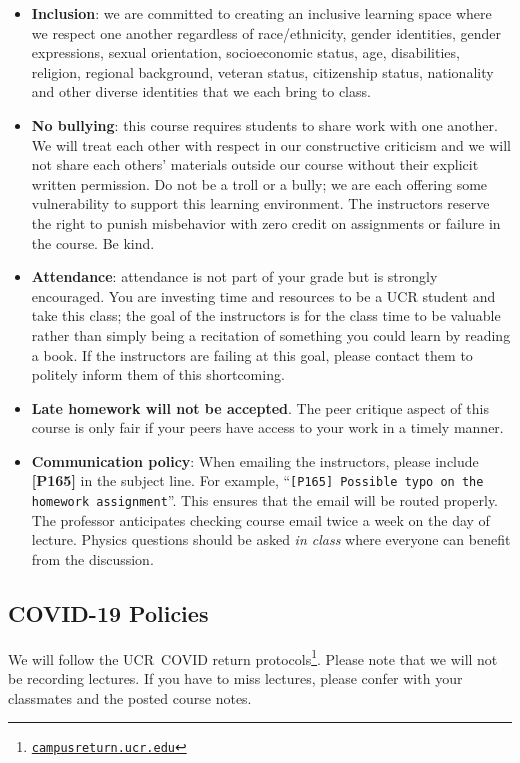 \documentclass[12pt]{article}
\newcommand{\footlink}[1]{\footnote{\href{https://#1}{\texttt{#1}}}}
\newcommand{\UCR}{\acro{UCR}\xspace}
\newcommand\acro[1]{{\small {#1}}}
\numberwithin{equation}{section}    %
\begin{document}
\begin{itemize}
	\item \textbf{Inclusion}: we are committed to creating an inclusive learning space where we respect one another regardless of race/ethnicity, gender identities, gender expressions, sexual orientation, socioeconomic status, age, disabilities, religion, regional background, veteran status, citizenship status, nationality and other diverse identities that we each bring to class.
	\item \textbf{No bullying}: this course requires students to share work with one another. We will treat each other with respect in our constructive criticism and we will not share each others' materials outside our course without their explicit written permission. Do not be a troll or a bully; we are each offering some vulnerability to support this learning environment. The instructors reserve the right to punish misbehavior with zero credit on assignments or failure in the course. Be kind.
	\item \textbf{Attendance}: attendance is not part of your grade but is strongly encouraged. You are investing time and resources to be a \UCR student and take this class; the goal of the instructors is for the class time to be valuable rather than simply being a recitation of something you could learn by reading a book. If the instructors are failing at this goal, please contact them to politely inform them of this shortcoming. 
	\item \textbf{Late homework will not be accepted}. The peer critique aspect of this course is only fair if your peers have access to your work in a timely manner.  
	\item \textbf{Communication policy}: When emailing the instructors, please include \textbf{[P165]} in the subject line. For example, ``\texttt{[P165] Possible typo on the homework assignment}''. This ensures that the email will be routed properly. The professor anticipates checking course email twice a week on the day of lecture. Physics questions should be asked \emph{in class} where everyone can benefit from the discussion.
\end{itemize}

\subsection{COVID-19 Policies}

We will follow the \UCR~\acro{COVID} return protocols\footlink{campusreturn.ucr.edu}. Please note that we will not be recording lectures. If you have to miss lectures, please confer with your classmates and the posted course notes. 
\end{document}
